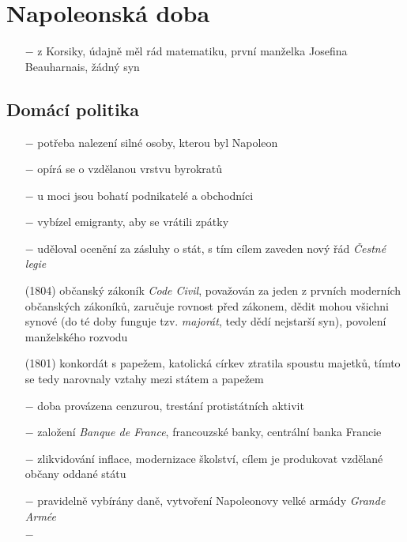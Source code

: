 \documentclass{article}
\begin{document}
\section*{Napoleonská doba}
\begin{itemize}
    \vspace{-0.5em}
    \setlength\itemsep{0.15em}
    \item[$-$] z Korsiky, údajně měl rád matematiku, první manželka Josefina Beauharnais, žádný syn
\end{itemize}

\subsection*{Domácí politika}
\begin{itemize}
    \vspace{-0.5em}
    \setlength\itemsep{0.15em}
    \item[$-$] potřeba nalezení silné osoby, kterou byl Napoleon
    \item[$-$] opírá se o vzdělanou vrstvu byrokratů
    \item[$-$] u moci jsou bohatí podnikatelé a obchodníci
    \item[$-$] vybízel emigranty, aby se vrátili zpátky
    \item[$-$] uděloval ocenění za zásluhy o stát, s tím cílem zaveden nový řád \textit{Čestné legie}
    \item[(1804)] občanský zákoník \textit{Code Civil}, považován za jeden z prvních moderních občanských zákoníků, zaručuje rovnost před zákonem, dědit mohou všichni synové (do té doby funguje tzv. \textit{majorát}, tedy dědí nejstarší syn), povolení manželského rozvodu
    \item[(1801)] konkordát s papežem, katolická církev ztratila spoustu majetků, tímto se tedy narovnaly vztahy mezi státem a papežem
    \item[$-$] doba provázena cenzurou, trestání protistátních aktivit
    \item[$-$] založení \textit{Banque de France}, francouzské banky, centrální banka Francie
    \item[$-$] zlikvidování inflace, modernizace školství, cílem je produkovat vzdělané občany oddané státu
    \item[$-$] pravidelně vybírány daně, vytvoření Napoleonovy velké armády \textit{Grande Armée}
    \item[$-$] 
\end{itemize}
\end{document}
